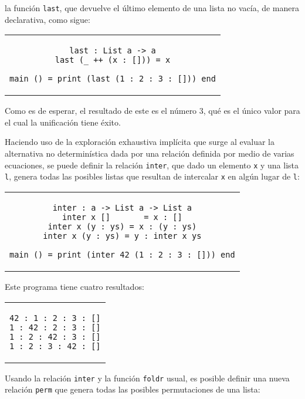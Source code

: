 la función \verb|last|, que devuelve el último elemento de una lista no vacía,
de manera declarativa, como sigue:
\begin{center}
\begin{tabular}{c}
\begin{lstlisting}[mathescape=true]
last : List a -> a
last (_ ++ (x : [])) = x

main () = print (last (1 : 2 : 3 : [])) end
\end{lstlisting}
\end{tabular}
\end{center}
Como es de esperar, el resultado de este es el número 3,
qué es el único valor para el cual la unificación tiene éxito.

Haciendo uso de la exploración exhaustiva implícita que surge al evaluar la
alternativa no determinística dada por una relación definida por medio de
varias ecuaciones, se puede definir la relación \verb|inter|,
que dado un elemento \verb|x| y una lista \verb|l|,
genera todas las posibles listas que resultan de intercalar \verb|x|
en algún lugar de \verb|l|:

\begin{center}
\begin{tabular}{c}
\begin{lstlisting}[mathescape=true]
inter : a -> List a -> List a
inter x []       = x : []
inter x (y : ys) = x : (y : ys)
inter x (y : ys) = y : inter x ys

main () = print (inter 42 (1 : 2 : 3 : [])) end
\end{lstlisting}
\end{tabular}
\end{center}
Este programa tiene cuatro resultados:
\begin{center}
\begin{tabular}{c}
\begin{lstlisting}[mathescape=true]
42 : 1 : 2 : 3 : []
1 : 42 : 2 : 3 : []
1 : 2 : 42 : 3 : []
1 : 2 : 3 : 42 : []
\end{lstlisting}
\end{tabular}
\end{center}
Usando la relación \verb|inter|
y la función \verb|foldr| usual,
es posible definir una nueva relación \verb|perm|
que genera todas las posibles permutaciones de una lista:

